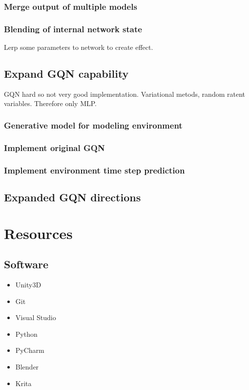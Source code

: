 \documentclass[a4paper, twoside, 10pt]{report}
\begin{document}
\subsection{Merge output of multiple models}
\subsection{Blending of internal network state}
Lerp some parameters to network to create effect.

\section{Expand GQN capability}
GQN hard so not very good implementation. Variational metods, random ratent variables. Therefore only MLP.

\subsection{Generative model for modeling environment}
\subsection{Implement original GQN}
\subsection{Implement environment time step prediction}
\section{Expanded GQN directions}

\chapter{Resources}
\section{Software}
\begin{itemize}
\item Unity3D
\item Git
\item Visual Studio
\item Python
\item PyCharm
\item Blender
\item Krita
\end{itemize}
\end{document}
